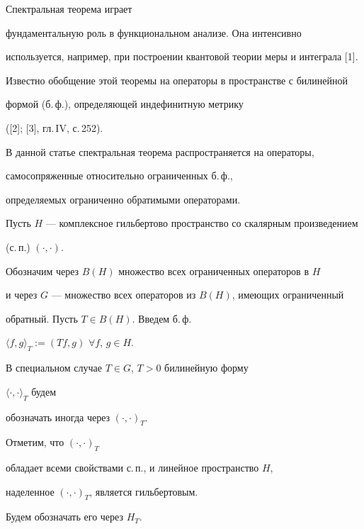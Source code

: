 

\maketitle


\label{begin}








Спектральная теорема играет


фундаментальную роль в функциональном анализе. Она интенсивно


используется, например, при построении квантовой теории меры и интеграла [1].


Известно обобщение этой теоремы на операторы в пространстве с билинейной


формой (б.\,ф.), определяющей индефинитную метрику


([2]; [3], гл.\,IV, с.\,252).


В данной статье спектральная теорема распространяется на операторы,


самосопряженные относительно ограниченных б.\,ф.,


определяемых ограниченно обратимыми операторами.





Пусть $H$ --- комплексное гильбертово пространство со скалярным произведением


(с.\,п.) $(\cdot,\cdot)$.


Обозначим через $B(H)$ множество всех ограниченных операторов в $H$


и через $G$ --- множество всех операторов из $B(H)$, имеющих ограниченный


обратный. Пусть $T\in B(H)$. Введем б.\,ф.


$\langle f,g\rangle_{T}:=(Tf,g)$ $\forall f$, $g\in H$.


В специальном случае $T\in G$, $T>0$ билинейную форму


$\langle\cdot, \cdot \rangle_{T}$ будем


обозначать иногда через $(\cdot,\cdot)_{T}$.


Отметим, что $(\cdot,\cdot)_{T}$


обладает всеми свойствами с.\,п., и линейное пространство $H$,


наделенное $(\cdot,\cdot)_{T}$, является гильбертовым.


Будем обозначать его через $H_{T}$.





